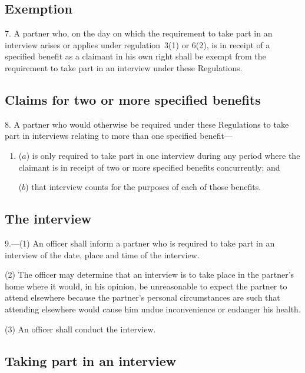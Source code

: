 \documentclass[12pt,a4paper]{article}
\begin{document}
\subsection[7. Exemption]{Exemption}

7.  A partner who, on the day on which the requirement to take part in an interview arises or applies under regulation~3(1) or 6(2), is in receipt of a specified benefit as a claimant in his own right shall be exempt from the requirement to take part in an interview under these Regulations.

\subsection[8. Claims for two or more specified benefits]{Claims for two or more specified benefits}

8.  A partner who would otherwise be required under these Regulations to take part in interviews relating to more than one specified benefit—
\begin{enumerate}\item[]
($a$) is only required to take part in one interview during any period where the claimant is in receipt of two or more specified benefits concurrently; and

($b$) that interview counts for the purposes of each of those benefits.
\end{enumerate}

\subsection[9. The interview]{The interview}

9.---(1)  An officer shall inform a partner who is required to take part in an interview of the date, place and time of the interview.

(2) The officer may determine that an interview is to take place in the partner’s home where it would, in his opinion, be unreasonable to expect the partner to attend elsewhere because the partner’s personal circumstances are such that attending elsewhere would cause him undue inconvenience or endanger his health.

(3) An officer shall conduct the interview.

\subsection[10. Taking part in an interview]{Taking part in an interview}
\end{document}
